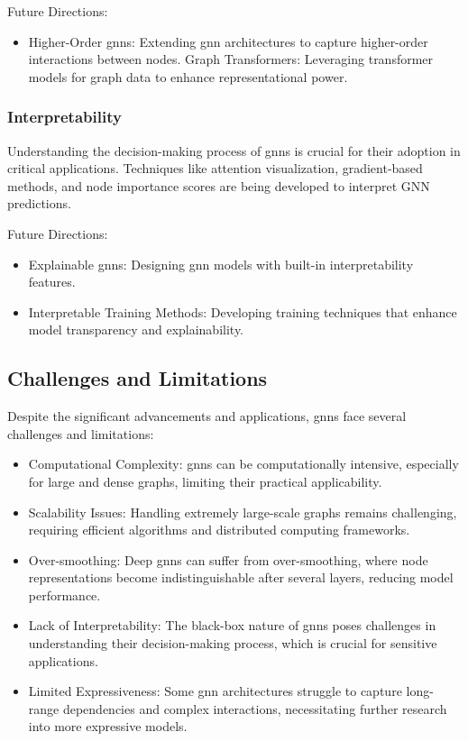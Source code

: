 Future Directions:
\begin{itemize}
    \item Higher-Order \glspl{gnn}: Extending \gls{gnn} architectures to capture higher-order interactions between nodes.
    Graph Transformers: Leveraging transformer models for graph data to enhance representational power.
\end{itemize}

\subsubsection*{Interpretability}

Understanding the decision-making process of \glspl{gnn} is crucial for their adoption in critical applications. Techniques like attention visualization, gradient-based methods, and node importance scores are being developed to interpret GNN predictions.

Future Directions:
\begin{itemize}
    \item Explainable \glspl{gnn}: Designing \gls{gnn} models with built-in interpretability features.
    \item Interpretable Training Methods: Developing training techniques that enhance model transparency and explainability.
\end{itemize}

\subsection*{Challenges and Limitations}

Despite the significant advancements and applications, \glspl{gnn} face several challenges and limitations:
\begin{itemize}
    \item Computational Complexity: \glspl{gnn} can be computationally intensive, especially for large and dense graphs, limiting their practical applicability.
    \item Scalability Issues: Handling extremely large-scale graphs remains challenging, requiring efficient algorithms and distributed computing frameworks.
    \item Over-smoothing: Deep \glspl{gnn} can suffer from over-smoothing, where node representations become indistinguishable after several layers, reducing model performance.
    \item Lack of Interpretability: The black-box nature of \glspl{gnn} poses challenges in understanding their decision-making process, which is crucial for sensitive applications.
    \item Limited Expressiveness: Some \gls{gnn} architectures struggle to capture long-range dependencies and complex interactions, necessitating further research into more expressive models.
\end{itemize}

